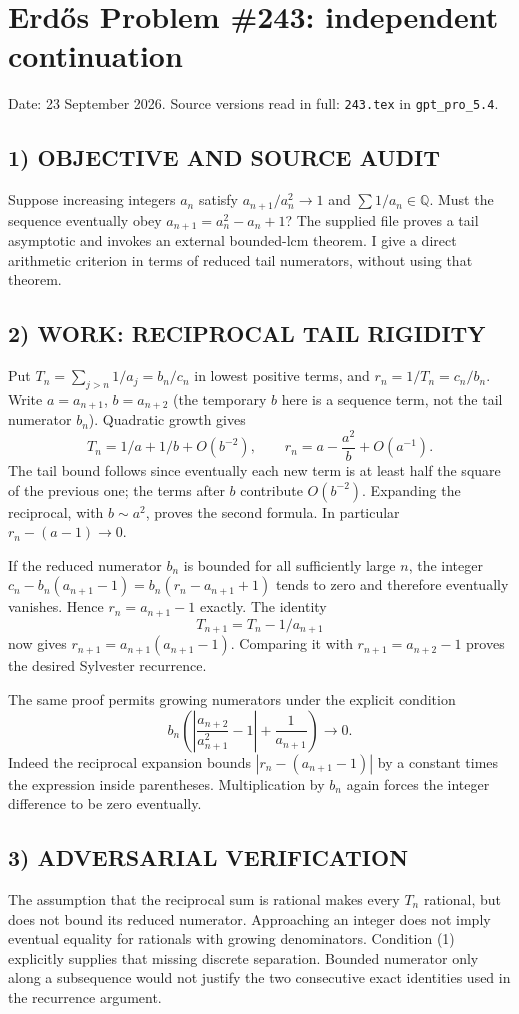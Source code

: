 \section{Erd\H{o}s Problem \#243: independent continuation}
\noindent Date: 23 September 2026. Source versions read in full: \texttt{243.tex} in \texttt{gpt\_pro\_5.4}.

\subsection*{1) OBJECTIVE AND SOURCE AUDIT}
Suppose increasing integers $a_n$ satisfy $a_{n+1}/a_n^2\to1$ and
$\sum1/a_n\in\mathbb Q$. Must the sequence eventually obey
$a_{n+1}=a_n^2-a_n+1$? The supplied file proves a tail asymptotic and
invokes an external bounded-lcm theorem. I give a direct arithmetic
criterion in terms of reduced tail numerators, without using that theorem.

\subsection*{2) WORK: RECIPROCAL TAIL RIGIDITY}
Put $T_n=\sum_{j>n}1/a_j=b_n/c_n$ in lowest positive terms, and
$r_n=1/T_n=c_n/b_n$. Write $a=a_{n+1}$, $b=a_{n+2}$ (the temporary
$b$ here is a sequence term, not the tail numerator $b_n$). Quadratic
growth gives
\[
 T_n=1/a+1/b+O(b^{-2}),\qquad
 r_n=a-\frac{a^2}{b}+O(a^{-1}).
\]
The tail bound follows since eventually each new term is at least half
the square of the previous one; the terms after $b$ contribute $O(b^{-2})$.
Expanding the reciprocal, with $b\sim a^2$, proves the second formula.
In particular $r_n-(a-1)\to0$.

If the reduced numerator $b_n$ is bounded for all sufficiently large $n$,
the integer
$c_n-b_n(a_{n+1}-1)=b_n(r_n-a_{n+1}+1)$ tends to zero and therefore
eventually vanishes. Hence $r_n=a_{n+1}-1$ exactly. The identity
\[
 T_{n+1}=T_n-1/a_{n+1}
\]
now gives $r_{n+1}=a_{n+1}(a_{n+1}-1)$. Comparing it with
$r_{n+1}=a_{n+2}-1$ proves the desired Sylvester recurrence.

The same proof permits growing numerators under the explicit condition
\[
 b_n\left(\left|\frac{a_{n+2}}{a_{n+1}^2}-1\right|
             +\frac1{a_{n+1}}\right)\longrightarrow0. \tag{1}
\]
Indeed the reciprocal expansion bounds $|r_n-(a_{n+1}-1)|$ by a constant
times the expression inside parentheses. Multiplication by $b_n$ again
forces the integer difference to be zero eventually.

\subsection*{3) ADVERSARIAL VERIFICATION}
The assumption that the reciprocal sum is rational makes every $T_n$
rational, but does not bound its reduced numerator. Approaching an integer
does not imply eventual equality for rationals with growing denominators.
Condition (1) explicitly supplies that missing discrete separation.
Bounded numerator only along a subsequence would not justify the two
consecutive exact identities used in the recurrence argument.

